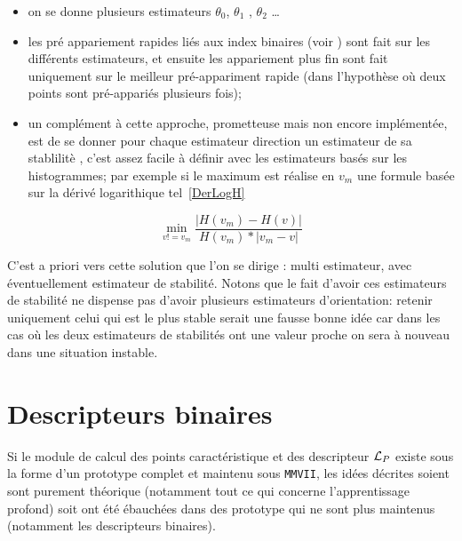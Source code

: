 \begin{itemize}
   \item on se donne plusieurs estimateurs $\theta_0$, $\theta_1$ , $\theta_2$ \dots 

   \item les pr\'e appariement rapides li\'es aux index binaires (voir \RefFantome)  sont
         fait sur les diff\'erents estimateurs, et ensuite les appariement plus fin sont
         fait uniquement sur le meilleur pr\'e-appariment rapide (dans l'hypoth\`ese o\`u
         deux points sont pr\'e-appari\'es  plusieurs fois);

   \item  un compl\'ement \`a cette approche, prometteuse mais non encore impl\'ement\'ee, est de se donner
          pour chaque estimateur  direction un estimateur de sa stablilit\`e , c'est assez facile
         \`a d\'efinir avec les estimateurs bas\'es sur les histogrammes; 
          par exemple si  le maximum est r\'ealise en $v_m$ une formule bas\'ee sur la d\'eriv\'e logarithique
          tel~\ref{DerLogH}
\end{itemize}

\begin{equation}
    \min_{v!=v_m}\frac{|H(v_m)-H(v)|}{H(v_m)*|v_m-v|} \label{DerLogH}
\end{equation}

C'est a priori vers cette solution que l'on se dirige : multi estimateur, avec \'eventuellement estimateur
de stabilit\'e. Notons que le fait d'avoir ces estimateurs de stabilit\'e ne dispense pas d'avoir
plusieurs estimateurs d'orientation: retenir uniquement celui qui est le plus stable serait une fausse bonne id\'ee
car dans les cas o\`u les deux estimateurs de stabilit\'es ont une valeur proche on sera \`a 
nouveau dans une situation instable.


\section{Descripteurs binaires}

Si le module de calcul des points caract\'eristique et des descripteur ${\mathcal L_P}$ existe sous 
la forme d'un prototype complet et maintenu sous {\tt MMVII}, les id\'ees d\'ecrites soient sont
purement th\'eorique (notamment tout ce qui concerne l'apprentissage profond) soit ont
\'et\'e \'ebauch\'ees dans des prototype qui ne sont plus maintenus (notamment les descripteurs
binaires).

